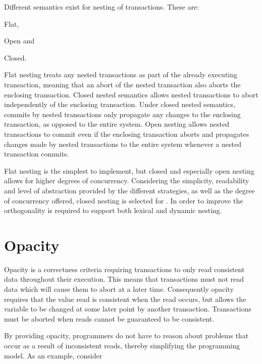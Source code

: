 Different semantics exist for nesting of transactions. These are:  \begin{inparaenum}
\item Flat,
\item Open and
\item Closed\cite[p. 1]{kumar2011hparstm}\cite[p. 42]{harris2010transactional}.
\end{inparaenum}
Flat nesting treats any nested transactions as part of the already executing transaction, meaning that an abort of the nested transaction also aborts the enclosing transaction. Closed nested semantics allows nested transactions to abort independently of the enclosing transaction. Under closed nested semantics, commits by nested transactions only propagate any changes to the enclosing transaction, as opposed to the entire system. Open nesting allows nested transactions to commit even if the enclosing transaction aborts and propagates changes made by nested transactions to the entire system whenever a nested transaction commits.

Flat nesting is the simplest to implement, but closed and especially open nesting allows for higher degrees of concurrency\cite[p. 43]{harris2010transactional}. Considering the simplicity, readability and level of abstraction provided by the different strategies, as well as the degree of concurrency offered, closed nesting is selected for \stmnamesp. In order to improve the orthogonality \stmnamesp is required to support both lexical and dynamic nesting.

\section{Opacity}
\label{sec:stm_req_opacity}
Opacity is a correctness criteria requiring transactions to only read consistent data throughout their execution\cite[p. 1]{guerraoui2007opacity}\cite[p. 29]{harris2010transactional}. This means that transactions must not read data which will cause them to abort at a later time. Consequently opacity requires that the value read is consistent when the read occurs, but allows the variable to be changed at some later point by another transaction. Transactions must be aborted when reads cannot be guaranteed to be consistent.

By providing opacity, programmers do not have to reason about problems that occur as a result of inconsistent reads\cite[p. 28]{harris2010transactional}, thereby simplifying the programming model. As an example, consider 

